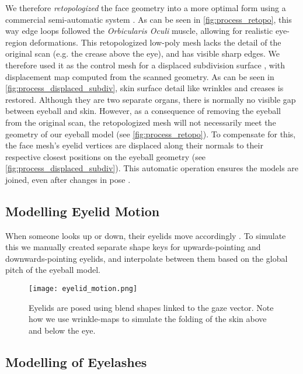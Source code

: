 
We therefore \emph{retopologized} the face geometry into a more optimal form using a commercial semi-automatic system \cite{ZRemesher}.
As can be seen in \autoref{fig:process_retopo}, this way edge loops followed the \emph{Orbicularis Oculi} muscle, allowing for realistic eye-region deformations.
This retopologized low-poly mesh lacks the detail of the original scan (e.g. the crease above the eye), and has visible sharp edges.
We therefore used it as the control mesh for a displaced subdivision surface \cite{lee2000displaced}, with displacement map computed from the scanned geometry.
As can be seen in \autoref{fig:process_displaced_subdiv}, skin surface detail like wrinkles and creases is  restored.
Although they are two separate organs, there is normally no visible gap between eyeball and skin.
However, as a consequence of removing the eyeball from the original scan, the retopologized mesh will not necessarily meet the geometry of our eyeball model (see \autoref{fig:process_retopo}).
To compensate for this, the face mesh's eyelid vertices are displaced along their normals to their respective closest positions on the eyeball geometry (see \autoref{fig:process_displaced_subdiv}).
This automatic operation ensures the models are joined, even after changes in pose \cite{Shrinkwrap}.

\subsection{Modelling Eyelid Motion}

When someone looks up or down, their eyelids move accordingly \cite{liversedge2011oxford}.
To simulate this we manually created separate shape keys for upwards-pointing and downwards-pointing eyelids, and interpolate between them based on the global pitch of the eyeball model.

\begin{figure}
    \texttt{[image: eyelid\_motion.png]}
    \caption{Eyelids are posed using blend shapes linked to the gaze vector. Note how we use wrinkle-maps to simulate the folding of the skin above and below the eye.}
\end{figure}

\subsection{Modelling of Eyelashes}

